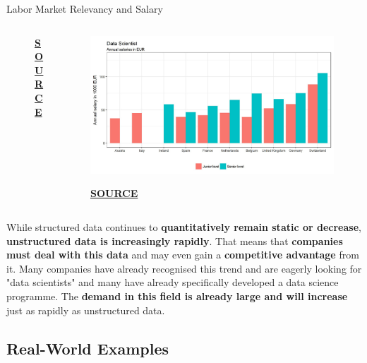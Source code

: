 \documentclass[main.tex]{subfiles}
\begin{document}
\begin{frame}{Labor Market Relevancy and Salary}
\begin{columns}
\begin{column}{.5\textwidth}
\begin{figure}
                    \tiny{\textbf{\href{https://media.thinknum.com/articles/massive-increase-in-demand-for-data-science-jobs-in-2019/}{SOURCE}}}
                \end{figure}
            \end{column}
            \begin{column}{.5\textwidth}
                \begin{figure}
                    \label{fig:salary}
                    \includegraphics[width=\textwidth,cframe=gray]{figures/external/salary.jpg}
                    
                    \tiny{\textbf{\href{https://www.datacareer.de/blog/data-scientist-salaries-in-europe-in-2018/}{SOURCE}}}
                \end{figure}
            \end{column}
        \end{columns}
    
        \begin{center}
            While structured data continues to \textbf{quantitatively remain static or decrease}, \textbf{unstructured data is increasingly rapidly}. That means that \textbf{companies must deal with this data} and may even gain a \textbf{competitive advantage} from it. Many companies have already recognised this trend and are eagerly looking for "data scientists" and many have already specifically developed a data science programme. The \textbf{demand in this field is already large and will increase} just as rapidly as unstructured data.
        \end{center}
    \end{frame}
    
    \subsection{Real-World Examples}
    
\end{document}
